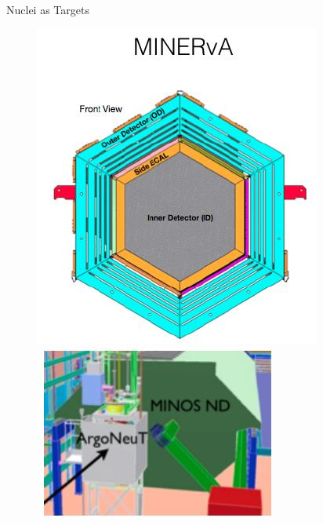 \documentclass[9pt]{beamer}    %
\begin{document}
\begin{frame}{Nuclei as Targets}
\begin{figure}
 \includegraphics[scale=.28]{p3.jpg}
 \includegraphics[scale=.30]{p4.jpg}
 \end{figure}
\end{frame}
\end{document}
